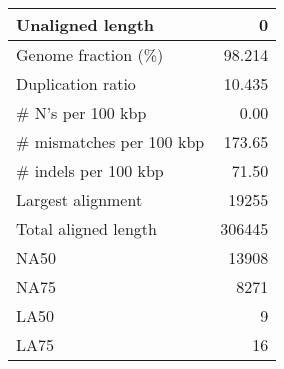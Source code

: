 \documentclass[12pt,a4paper]{article}
\begin{document}
\begin{table}[ht]
\begin{center}
\begin{tabular}{|l*{1}{|r}|}
Unaligned length & 0 \\ \hline
Genome fraction (\%) & 98.214 \\ \hline
Duplication ratio & 10.435 \\ \hline
\# N's per 100 kbp & 0.00 \\ \hline
\# mismatches per 100 kbp & 173.65 \\ \hline
\# indels per 100 kbp & 71.50 \\ \hline
Largest alignment & 19255 \\ \hline
Total aligned length & 306445 \\ \hline
NA50 & 13908 \\ \hline
NA75 & 8271 \\ \hline
LA50 & 9 \\ \hline
LA75 & 16 \\ \hline
\end{tabular}
\end{center}
\end{table}
\end{document}
